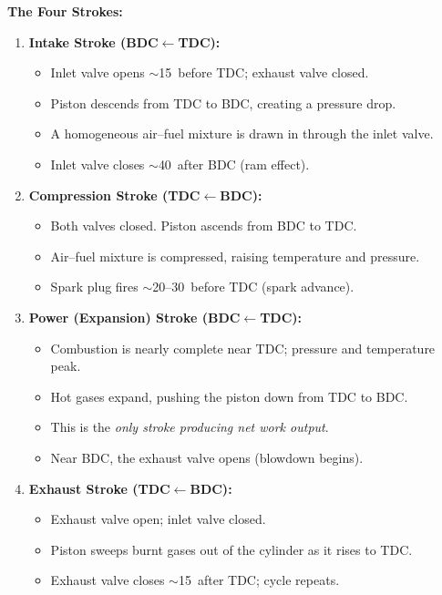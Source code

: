 \documentclass[12pt,a3paper]{article}
\begin{document}
\begin{enumerate}
\begin{tcolorbox}[enhanced,breakable,ansbox,colback=cB!4,colframe=cB,
  boxrule=0.8pt,arc=5pt,
  title={\textbf{Answer}},fonttitle=\bfseries\color{white},colbacktitle=cB]
\medskip
\textbf{The Four Strokes:}

\begin{enumerate}[leftmargin=1.8em,itemsep=5pt,label=\textbf{\arabic*.}]
  \item \textbf{Intake Stroke (BDC$\leftarrow$TDC):}
    \begin{itemize}[leftmargin=1.2em,itemsep=1pt]
      \item Inlet valve opens $\sim$15\textdegree\ before TDC; exhaust valve closed.
      \item Piston descends from TDC to BDC, creating a pressure drop.
      \item A homogeneous air--fuel mixture is drawn in through the inlet valve.
      \item Inlet valve closes $\sim$40\textdegree\ after BDC (ram effect).
    \end{itemize}

  \item \textbf{Compression Stroke (TDC$\leftarrow$BDC):}
    \begin{itemize}[leftmargin=1.2em,itemsep=1pt]
      \item Both valves closed. Piston ascends from BDC to TDC.
      \item Air--fuel mixture is compressed, raising temperature and pressure.
      \item Spark plug fires $\sim$20--30\textdegree\ before TDC (spark advance).
    \end{itemize}

  \item \textbf{Power (Expansion) Stroke (BDC$\leftarrow$TDC):}
    \begin{itemize}[leftmargin=1.2em,itemsep=1pt]
      \item Combustion is nearly complete near TDC; pressure and temperature peak.
      \item Hot gases expand, pushing the piston down from TDC to BDC.
      \item This is the \emph{only stroke producing net work output}.
      \item Near BDC, the exhaust valve opens (blowdown begins).
    \end{itemize}

  \item \textbf{Exhaust Stroke (TDC$\leftarrow$BDC):}
    \begin{itemize}[leftmargin=1.2em,itemsep=1pt]
      \item Exhaust valve open; inlet valve closed.
      \item Piston sweeps burnt gases out of the cylinder as it rises to TDC.
      \item Exhaust valve closes $\sim$15\textdegree\ after TDC; cycle repeats.
    \end{itemize}
\end{enumerate}


\end{tcolorbox}
\end{enumerate}
\end{document}
